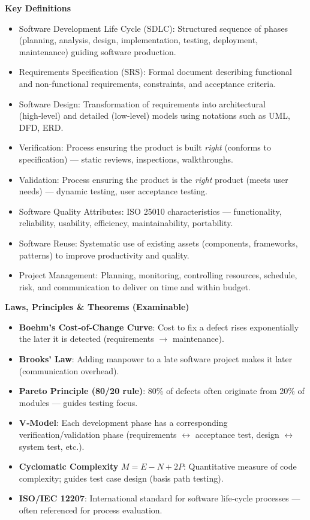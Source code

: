 \documentclass[11pt]{article}
\newcommand{\cle}[1]{{\popxbold\color{popdark}#1}}
\begin{document}
\begin{bilan}
\textbf{Key Definitions}
\begin{itemize}
\item \cle{Software Development Life Cycle (SDLC)}: Structured sequence of phases (planning, analysis, design, implementation, testing, deployment, maintenance) guiding software production.
\item \cle{Requirements Specification (SRS)}: Formal document describing functional and non‑functional requirements, constraints, and acceptance criteria.
\item \cle{Software Design}: Transformation of requirements into architectural (high‑level) and detailed (low‑level) models using notations such as UML, DFD, ERD.
\item \cle{Verification}: Process ensuring the product is built \emph{right} (conforms to specification) — static reviews, inspections, walkthroughs.
\item \cle{Validation}: Process ensuring the product is the \emph{right} product (meets user needs) — dynamic testing, user acceptance testing.
\item \cle{Software Quality Attributes}: ISO 25010 characteristics — functionality, reliability, usability, efficiency, maintainability, portability.
\item \cle{Software Reuse}: Systematic use of existing assets (components, frameworks, patterns) to improve productivity and quality.
\item \cle{Project Management}: Planning, monitoring, controlling resources, schedule, risk, and communication to deliver on time and within budget.
\end{itemize}

\textbf{Laws, Principles \& Theorems (Examinable)}
\begin{itemize}
\item \textbf{Boehm’s Cost‑of‑Change Curve}: Cost to fix a defect rises exponentially the later it is detected (requirements $\rightarrow$ maintenance).
\item \textbf{Brooks’ Law}: Adding manpower to a late software project makes it later (communication overhead).
\item \textbf{Pareto Principle (80/20 rule)}: 80\% of defects often originate from 20\% of modules — guides testing focus.
\item \textbf{V‑Model}: Each development phase has a corresponding verification/validation phase (requirements $\leftrightarrow$ acceptance test, design $\leftrightarrow$ system test, etc.).
\item \textbf{Cyclomatic Complexity} $M = E - N + 2P$: Quantitative measure of code complexity; guides test case design (basis path testing).
\item \textbf{ISO/IEC 12207}: International standard for software life‑cycle processes — often referenced for process evaluation.
\end{itemize}


\end{bilan}
\end{document}
